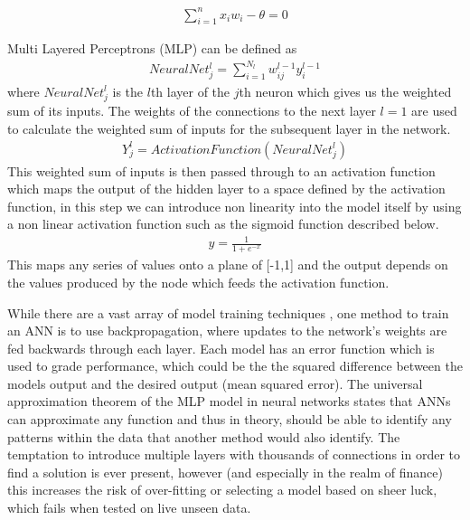 \documentclass[11pt]{article}
\begin{document}
\begin{align}
\sum^{n}_{i = 1} x_{i}w_{i} - \theta = 0  
\end{align}

Multi Layered Perceptrons (MLP) can be defined as 
\begin{align}
NeuralNet^{l}_{j} =  \sum^{N_{l}}_{i = 1}w^{l-1}_{ij} y^{l-1}_{i}  
\end{align}
where $NeuralNet^{l}_{j}$ is the $l$th layer of the $j$th neuron which gives us the weighted sum of its inputs. The weights of the connections to the next layer $l=1$ are used to calculate the weighted sum of inputs for the subsequent layer in the network.  \begin{align}
Y^{l}_{j} =  ActivationFunction(NeuralNet^{l}_{j})  
\end{align} 
This weighted sum of inputs is then passed through to an activation function which maps the output of the hidden layer to a space defined by the activation function, in this step we can introduce non linearity into the model itself by using a non linear activation function such as the sigmoid function described below.
\begin{align}
y =  \frac{1}{1+e^{-x} }
\end{align} 
This maps any series of values onto a plane of [-1,1] and the output depends on the values produced by the node which feeds the activation function. \par While there are a vast array of model training techniques , one method to train an ANN is to use backpropagation, where updates to the network's weights are fed backwards through each layer. Each model has an error function which is used to grade performance, which could be the the squared difference between the models output and the desired output (mean squared error).  \newline The universal approximation theorem \cite{Kurkova1992} of the MLP model in neural networks states that ANNs can approximate any function and thus in theory, should be able to identify any patterns within the data that another method would also identify. \newline The temptation to introduce multiple layers with thousands of connections in order to find a solution is ever present, however (and especially in the realm of finance) this increases the risk of over-fitting or selecting a model based on sheer luck, which fails when tested on live unseen data. 
\end{document}

